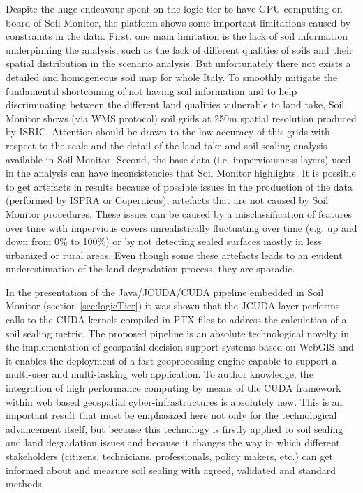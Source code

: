 \documentclass[APA,LATO1COL,doublespace]{WileyNJD-v2}
\begin{document}
Despite the huge endeavour spent on the logic tier to have GPU computing on board of Soil Monitor, the platform shows some important limitations caused by constraints in the data.
First, one main limitation is the lack of soil information underpinning the analysis, %
such as the lack of different qualities of soils and their spatial distribution in the scenario analysis.
But unfortunately there not exists a detailed and homogeneous soil map for whole Italy.
To smoothly mitigate the fundamental shortcoming of not having soil information and to help discriminating between the different land qualities vulnerable to land take, Soil Monitor shows (via WMS protocol) soil grids at 250m spatial resolution produced by ISRIC.
Attention should be drawn to the low accuracy of this grids with respect to the scale and the detail of the land take and soil sealing analysis available in Soil Monitor.
Second, the base data (i.e. imperviousness layers) used in the analysis can have inconsistencies that Soil Monitor highlights.
It is possible to get artefacts in results %
because of possible issues in the production of the data (performed by ISPRA or Copernicus), artefacts that are not caused by Soil Monitor procedures. %
These issues can be caused by a misclassification of features over time with impervious covers unrealistically fluctuating over time (e.g. up and down from 0\% to 100\%) or by not detecting sealed surfaces mostly in less urbanized or rural areas.
Even though some these artefacts leads to an evident underestimation of the land degradation process, they are sporadic.

In the presentation of the Java/JCUDA/CUDA pipeline embedded in Soil Monitor (section \ref{sec:logicTier}) 
it was shown that the JCUDA layer performs calls to the CUDA kernels compiled in PTX files to address the calculation of a soil sealing metric.
The proposed pipeline is an absolute technological novelty in the implementation of geospatial decision support systems based on WebGIS and it enables the deployment of a fast geoprocessing engine capable to support a multi-user and multi-tasking web application.
To author knowledge, the
integration of high performance computing by means of the CUDA framework within web based geospatial cyber-infrastructures is absolutely new.
This is an important result that must be emphasized here not only for the technological advancement itself, but because this technology is firstly applied to soil sealing and land degradation issues and because it changes the way in which different stakeholders (citizens, technicians, professionals, policy makers, etc.) can get informed about and measure soil sealing with agreed, validated and standard methods.
\end{document}
